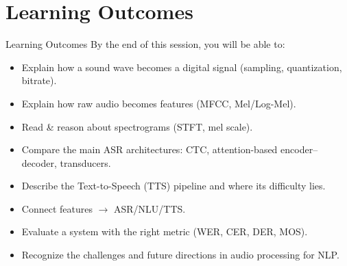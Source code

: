 \section{Learning Outcomes}

\begin{frame}[allowframebreaks]{Learning Outcomes}
    By the end of this session, you will be able to:
    \begin{itemize}
        \setlength{\itemsep}{0.4em}
        \item Explain how a sound wave becomes a digital signal (sampling, quantization, bitrate).
        \item Explain how raw audio becomes features (MFCC, Mel/Log-Mel).
        \item Read \& reason about spectrograms (STFT, mel scale).
        \item Compare the main ASR architectures: CTC, attention-based encoder--decoder, transducers.
        \item Describe the Text-to-Speech (TTS) pipeline and where its difficulty lies.
        \item Connect features $\rightarrow$ ASR/NLU/TTS.
        \item Evaluate a system with the right metric (WER, CER, DER, MOS).
        \item Recognize the challenges and future directions in audio processing for NLP.
    \end{itemize}
\end{frame}

